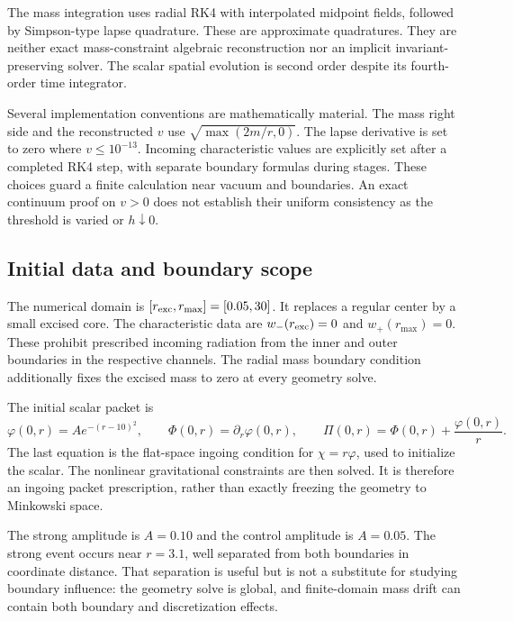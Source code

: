 The mass integration uses radial RK4 with interpolated midpoint fields, followed by Simpson-type lapse quadrature. These are approximate quadratures. They are neither exact mass-constraint algebraic reconstruction nor an implicit invariant-preserving solver. The scalar spatial evolution is second order despite its fourth-order time integrator.

Several implementation conventions are mathematically material. The mass right side and the reconstructed $v$ use $\sqrt{\max(2m/r,0)}$. The lapse derivative is set to zero where $v\le10^{-13}$. Incoming characteristic values are explicitly set after a completed RK4 step, with separate boundary formulas during stages. These choices guard a finite calculation near vacuum and boundaries. An exact continuum proof on $v>0$ does not establish their uniform consistency as the threshold is varied or $h\downarrow0$.

\subsection{Initial data and boundary scope}
The numerical domain is $[r_{\rm exc},r_{\max}]=[0.05,30]$. It replaces a regular center by a small excised core. The characteristic data are $w_-(r_{\rm exc})=0$ and $w_+(r_{\max})=0$. These prohibit prescribed incoming radiation from the inner and outer boundaries in the respective channels. The radial mass boundary condition additionally fixes the excised mass to zero at every geometry solve.

The initial scalar packet is
\begin{equation}
 \varphi(0,r)=A e^{-(r-10)^2},\qquad
 \Phi(0,r)=\partial_r\varphi(0,r),\qquad
 \Pi(0,r)=\Phi(0,r)+\frac{\varphi(0,r)}r.
\end{equation}
The last equation is the flat-space ingoing condition for $\chi=r\varphi$, used to initialize the scalar. The nonlinear gravitational constraints are then solved. It is therefore an ingoing packet prescription, rather than exactly freezing the geometry to Minkowski space.

The strong amplitude is $A=0.10$ and the control amplitude is $A=0.05$. The strong event occurs near $r=3.1$, well separated from both boundaries in coordinate distance. That separation is useful but is not a substitute for studying boundary influence: the geometry solve is global, and finite-domain mass drift can contain both boundary and discretization effects.

